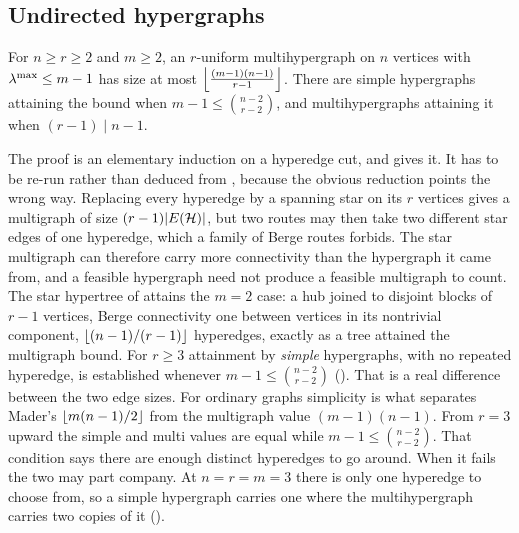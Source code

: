 \subsection{Undirected hypergraphs}

\begin{theorem}\label{prop:hyper-edge}
For $n\ge r\ge2$ and $m\ge2$, an $r$-uniform multihypergraph on $n$ vertices with $\lambda^{\max}\le m-1$ has size at most $\left\lfloor \frac{(m-1)(n-1)}{r-1} \right\rfloor$. There are simple hypergraphs attaining the bound when $m - 1 \le \binom{n-2}{r-2}$, and multihypergraphs attaining it when $(r-1) \mid n - 1$.
\end{theorem}

The proof is an elementary induction on a hyperedge cut, and  gives it.
It has to be re-run rather than deduced from , because the obvious reduction points the wrong way. Replacing every hyperedge by a spanning star on its $r$ vertices gives a multigraph of size $(r-1)|E(\mathcal{H})|$, but two routes may then take two different star edges of one hyperedge, which a family of Berge routes forbids. The star multigraph can therefore carry more connectivity than the hypergraph it came from, and a feasible hypergraph need not produce a feasible multigraph to count.
The star hypertree of  attains the $m = 2$ case: a hub joined to disjoint blocks of $r-1$ vertices, Berge connectivity one between vertices in its nontrivial component, $\left\lfloor (n-1)/(r-1) \right\rfloor$ hyperedges, exactly as a tree attained the multigraph bound.
For $r \ge 3$ attainment by \emph{simple} hypergraphs, with no repeated hyperedge, is established whenever $m-1\le\binom{n-2}{r-2}$ ().
That is a real difference between the two edge sizes.
For ordinary graphs simplicity is what separates Mader's $\left\lfloor m(n-1)/2 \right\rfloor$ from the multigraph value $(m-1)(n-1)$. From $r = 3$ upward the simple and multi values are equal while $m-1\le\binom{n-2}{r-2}$. That condition says there are enough distinct hyperedges to go around. When it fails the two may part company. At $n = r = m = 3$ there is only one hyperedge to choose from, so a simple hypergraph carries one where the multihypergraph carries two copies of it ().

